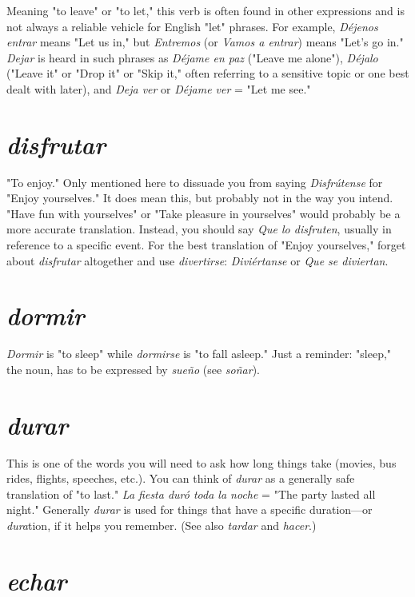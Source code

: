 Meaning "to leave" or "to let," this verb is often found in
other expressions and is not always a reliable vehicle for English "let"
phrases. For example, \emph{Déjenos entrar} means "Let us in," but \emph{Entremos}
(or \emph{Vamos a entrar}) means "Let's go in." \emph{Dejar} is heard in such phrases
as \emph{Déjame en paz} ("Leave me alone"), \emph{Déjalo} ("Leave it" or "Drop it"
or "Skip it," often referring to a sensitive topic or one best dealt with
later), and \emph{Deja ver} or \emph{Déjame ver} = "Let me see."

\section{\emph{disfrutar}}

"To enjoy." Only mentioned here to dissuade you from saying
\emph{Disfrútense} for "Enjoy yourselves." It does mean this, but probably not
in the way you intend. "Have fun with yourselves" or "Take pleasure
in yourselves" would probably be a more accurate translation. Instead,
you should say \emph{Que lo disfruten}, usually in reference to a specific
event. For the best translation of "Enjoy yourselves," forget about \emph{disfrutar} altogether and use \emph{divertirse}: \emph{Diviértanse} or \emph{Que se diviertan}.

\section{\emph{dormir}}

\emph{Dormir} is "to sleep" while \emph{dormirse} is "to fall asleep." Just a
reminder: "sleep," the noun, has to be expressed by \emph{sueño} (see \emph{soñar}).

\section{\emph{durar}}

This is one of the words you will need to ask how long things
take (movies, bus rides, flights, speeches, etc.). You can think of \emph{durar}
as a generally safe translation of "to last." \emph{La fiesta duró toda la noche}
= "The party lasted all night." Generally \emph{durar} is used for things that
have a specific duration---or \emph{dura}tion, if it helps you remember. (See
also \emph{tardar} and \emph{hacer}.)

\section{\emph{echar}}

